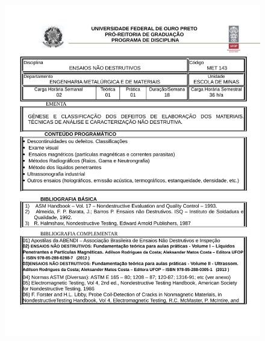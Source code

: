 \begin{figure}[p]
	\centering 
	\includegraphics[scale=0.7]{capitulos/anexo1-programas-disciplina/eg316.pdf}
\end{figure}


